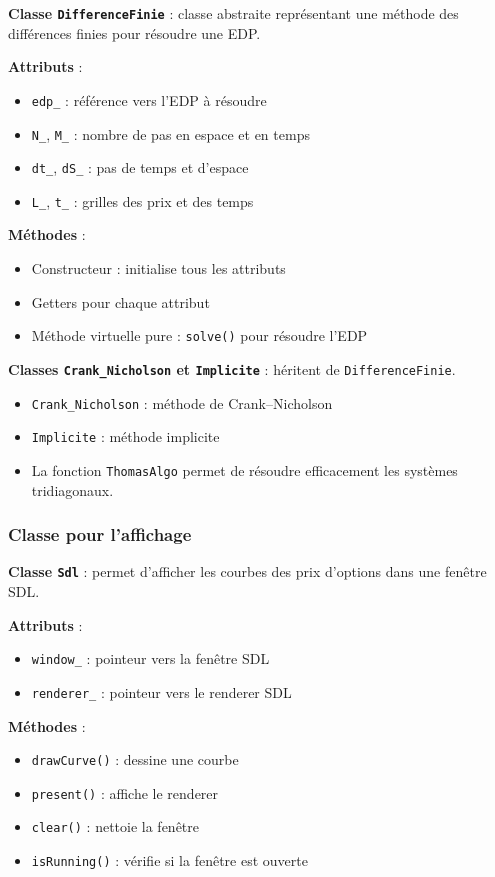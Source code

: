 \documentclass[12pt,a4paper]{article}
\begin{document}
\textbf{Classe \texttt{DifferenceFinie}} : classe abstraite représentant une méthode des différences finies pour résoudre une EDP.

\textbf{Attributs} :
\begin{itemize}
    \item \texttt{edp\_} : référence vers l’EDP à résoudre
    \item \texttt{N\_}, \texttt{M\_} : nombre de pas en espace et en temps
    \item \texttt{dt\_}, \texttt{dS\_} : pas de temps et d’espace
    \item \texttt{L\_}, \texttt{t\_} : grilles des prix et des temps
\end{itemize}

\textbf{Méthodes} :
\begin{itemize}
    \item Constructeur : initialise tous les attributs
    \item Getters pour chaque attribut
    \item Méthode virtuelle pure : \texttt{solve()} pour résoudre l’EDP
\end{itemize}

\textbf{Classes \texttt{Crank\_Nicholson} et \texttt{Implicite}} : héritent de \texttt{DifferenceFinie}.
\begin{itemize}
    \item \texttt{Crank\_Nicholson} : méthode de Crank--Nicholson
    \item \texttt{Implicite} : méthode implicite
    \item La fonction \texttt{ThomasAlgo} permet de résoudre efficacement les systèmes tridiagonaux.
\end{itemize}

\subsubsection{Classe pour l’affichage}

\textbf{Classe \texttt{Sdl}} : permet d’afficher les courbes des prix d’options dans une fenêtre SDL.

\textbf{Attributs} :
\begin{itemize}
    \item \texttt{window\_} : pointeur vers la fenêtre SDL
    \item \texttt{renderer\_} : pointeur vers le renderer SDL
\end{itemize}

\textbf{Méthodes} :
\begin{itemize}
    \item \texttt{drawCurve()} : dessine une courbe
    \item \texttt{present()} : affiche le renderer
    \item \texttt{clear()} : nettoie la fenêtre
    \item \texttt{isRunning()} : vérifie si la fenêtre est ouverte
\end{itemize}
\end{document}
